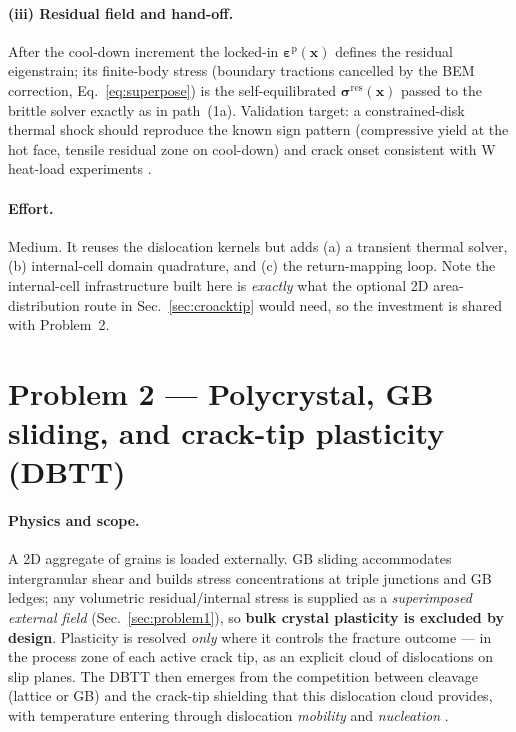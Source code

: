 \documentclass[11pt]{article}
\newcommand{\xvec}{\mathbf{x}}
\newcommand{\epspl}{\bm{\varepsilon}^{\mathrm{p}}}
\newcommand{\sig}{\bm{\sigma}}
\begin{document}
\paragraph{(iii) Residual field and hand-off.} After the cool-down increment the
locked-in $\epspl(\xvec)$ defines the residual eigenstrain; its finite-body
stress (boundary tractions cancelled by the BEM correction,
Eq.~\eqref{eq:superpose}) is the self-equilibrated $\sig^{\mathrm{res}}(\xvec)$
passed to the brittle solver exactly as in path~(1a). Validation target: a
constrained-disk thermal shock should reproduce the known sign pattern
(compressive yield at the hot face, tensile residual zone on cool-down) and
crack onset consistent with W heat-load experiments \citep{araksheev_w,
pintsuk2011}.

\paragraph{Effort.} Medium. It reuses the dislocation kernels but adds (a) a
transient thermal solver, (b) internal-cell domain quadrature, and (c) the
return-mapping loop. Note the internal-cell infrastructure built here is
\emph{exactly} what the optional 2D area-distribution route in
Sec.~\ref{sec:croacktip} would need, so the investment is shared with
Problem~2.

\section{Problem 2 --- Polycrystal, GB sliding, and crack-tip plasticity (DBTT)}
\label{sec:problem2}

\paragraph{Physics and scope.} A 2D aggregate of grains is loaded externally.
GB sliding accommodates intergranular shear and builds stress concentrations at
triple junctions and GB ledges; any volumetric residual/internal stress is
supplied as a \emph{superimposed external field} (Sec.~\ref{sec:problem1}), so
\textbf{bulk crystal plasticity is excluded by design}. Plasticity is resolved
\emph{only} where it controls the fracture outcome --- in the process zone of
each active crack tip, as an explicit cloud of dislocations on slip planes. The
DBTT then emerges from the competition between cleavage (lattice or GB) and the
crack-tip shielding that this dislocation cloud provides, with temperature
entering through dislocation \emph{mobility} and \emph{nucleation}
\citep{rice_thomson1974,rice1992,hirsch_roberts1991,gumbsch1998,
giannattasio_roberts2007,tarleton_roberts2009,hartmaier_gumbsch2005}.
\end{document}

